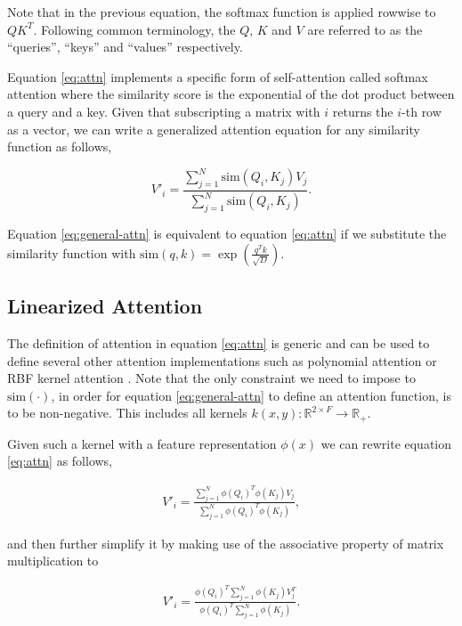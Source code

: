 Note that in the previous equation, the softmax function is applied rowwise to $Q K^T$. Following common terminology, the $Q$, $K$ and $V$ are referred to as the ``queries'', ``keys'' and ``values'' respectively.

Equation \ref{eq:attn} implements a specific form of self-attention called softmax attention where the similarity score is the exponential of the dot product between a query and a key. Given that subscripting a matrix with $i$ returns the $i$-th row as a vector, we can write a generalized attention equation for any similarity function as follows,

\begin{equation}
    V'_i = \frac{\sum_{j=1}^N \text{sim}\left(Q_i, K_j\right) V_j}
                {\sum_{j=1}^N \text{sim}\left(Q_i, K_j\right)}.
    \label{eq:general-attn}
\end{equation}

Equation \ref{eq:general-attn} is equivalent to equation \ref{eq:attn} if we substitute the similarity function with $\text{sim}\left(q, k\right) = \exp\left(\frac{q^T
k}{\sqrt{D}}\right)$.

\subsection{Linearized Attention} \label{sec:method-linear}

The definition of attention in equation \ref{eq:attn} is generic and can be used to define several other attention implementations such as polynomial attention or RBF kernel attention \cite{tsai2019transformer}. Note that the only constraint we need to impose to $\text{sim}\left(\cdot\right)$, in order for equation \ref{eq:general-attn} to define an attention function, is to be non-negative. This includes all kernels $k(x, y) : \mathbb{R}^{2 \times F} \to \mathbb{R}^{}_+$.

Given such a kernel with a feature representation $\phi\left(x\right)$ we can rewrite equation \ref{eq:attn} as follows,

\begin{align}
    V'_i = \frac{\sum_{j=1}^N \phi\left(Q_i\right)^T \phi\left(K_j\right) V_j}
                 {\sum_{j=1}^N \phi\left(Q_i\right)^T \phi\left(K_j\right)},
\end{align}

and then further simplify it by making use of the associative property of matrix multiplication to

\begin{align}
     V'_i = \frac{\phi\left(Q_i\right)^T \sum_{j=1}^N \phi\left(K_j\right) V_j^T}
             {\phi\left(Q_i\right)^T \sum_{j=1}^N \phi\left(K_j\right)}.
    \label{eq:linear_attn}
\end{align}

